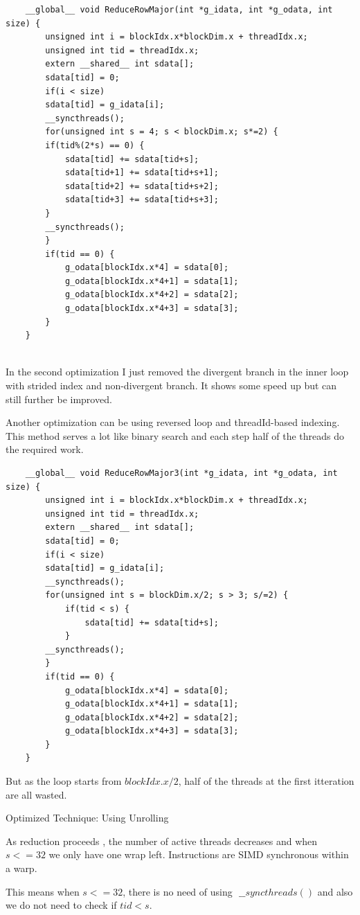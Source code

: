 \documentclass[a4paper, 14pt]{article}
\begin{document}
	\begin{lstlisting}
	__global__ void ReduceRowMajor(int *g_idata, int *g_odata, int size) {
		unsigned int i = blockIdx.x*blockDim.x + threadIdx.x;	
		unsigned int tid = threadIdx.x;
		extern __shared__ int sdata[];
		sdata[tid] = 0;
		if(i < size)
		sdata[tid] = g_idata[i];
		__syncthreads();
		for(unsigned int s = 4; s < blockDim.x; s*=2) {
		if(tid%(2*s) == 0) {
			sdata[tid] += sdata[tid+s];
			sdata[tid+1] += sdata[tid+s+1];
			sdata[tid+2] += sdata[tid+s+2];
			sdata[tid+3] += sdata[tid+s+3];
		}	
		__syncthreads();
		}
		if(tid == 0) {
			g_odata[blockIdx.x*4] = sdata[0];
			g_odata[blockIdx.x*4+1] = sdata[1];
			g_odata[blockIdx.x*4+2] = sdata[2];
			g_odata[blockIdx.x*4+3] = sdata[3];
		}
	}
	
	\end{lstlisting}
	\par
	In the second optimization I just removed the divergent branch in the inner loop with strided index and non-divergent branch. It shows some speed up but can still further be improved.

	Another optimization can be using reversed loop and threadId-based indexing. This method serves a lot like binary search and each step half of the threads do the required work. 
	\par
	\begin{lstlisting}
	__global__ void ReduceRowMajor3(int *g_idata, int *g_odata, int size) {
		unsigned int i = blockIdx.x*blockDim.x + threadIdx.x;	
		unsigned int tid = threadIdx.x;
		extern __shared__ int sdata[];
		sdata[tid] = 0;
		if(i < size)
		sdata[tid] = g_idata[i];
		__syncthreads();
		for(unsigned int s = blockDim.x/2; s > 3; s/=2) {
			if(tid < s) {
				sdata[tid] += sdata[tid+s];
			}	
		__syncthreads();
		}
		if(tid == 0) {
			g_odata[blockIdx.x*4] = sdata[0];
			g_odata[blockIdx.x*4+1] = sdata[1];
			g_odata[blockIdx.x*4+2] = sdata[2];
			g_odata[blockIdx.x*4+3] = sdata[3];
		}
	}
	\end{lstlisting}
	But as the loop starts from $blockIdx.x/2$, half of the threads at the first itteration are all wasted.
	
	Optimized Technique: Using Unrolling

	As reduction proceeds , the number of active threads decreases and when $s <=32$ we only have one wrap left. Instructions are SIMD synchronous within a warp.
	
	This means when $s<=32$, there is no need of using $ $ $\_\_syncthreads()$ and also we do not need to check if $tid < s$.
	
\end{document}

